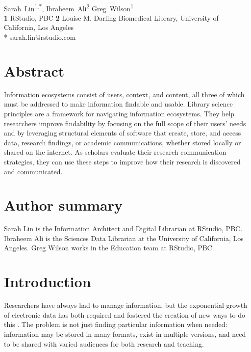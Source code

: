 \documentclass[10pt,letterpaper]{article}
\begin{document}
\vspace*{0.2in}

\begin{flushleft}
{\Large
\textbf{}
}
\newline
\\
{Sarah~Lin}\textsuperscript{1,*},
{Ibraheem~Ali}\textsuperscript{2}
{Greg~Wilson}\textsuperscript{1}
\\
\textbf{1} RStudio, PBC
\textbf{2} Louise M. Darling Biomedical Library, University of California, Los Angeles
\\
\bigskip
* sarah.lin@rstudio.com
\end{flushleft}

\section*{Abstract}

Information ecosystems consist of users, context, and content, all three of
which must be addressed to make information findable and usable. Library
science principles are a framework for navigating information ecosystems. They
help researchers improve findability by focusing on the full scope of their
users' needs and by leveraging structural elements of software that create,
store, and access data, research findings, or academic communications, whether
stored locally or shared on the internet. As scholars evaluate their research
communication strategies, they can use these steps to improve how their research
is discovered and communicated.

\section*{Author summary}

Sarah Lin is the Information Architect and Digital Librarian at RStudio, PBC.
Ibraheem Ali is the Sciences Data Librarian at the University of California, Los Angeles.
Greg Wilson works in the Education team at RStudio, PBC.

\section*{Introduction}

Researchers have always had to manage information, but the exponential growth of
electronic data has both required and fostered the creation of new ways to do
this \cite{Rosenfeld2015,Hedden2016}. The problem is not just finding
particular information when needed: information may be stored in many formats,
exist in multiple versions, and need to be shared with varied audiences for both
research and teaching.
\end{document}

